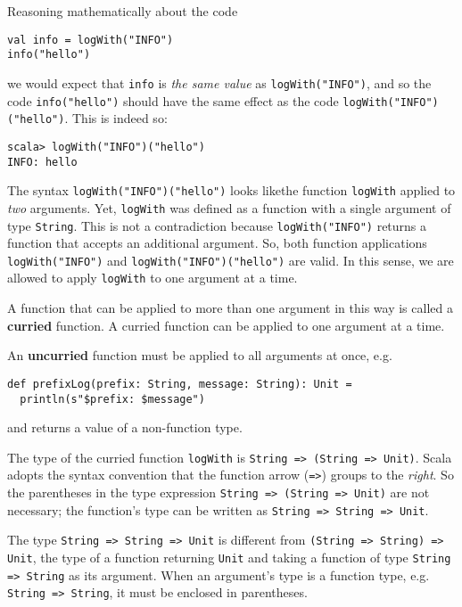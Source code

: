 Reasoning mathematically about the code
\begin{lstlisting}
val info = logWith("INFO")
info("hello")
\end{lstlisting}
we would expect that \lstinline!info! is \emph{the same value} as
\lstinline!logWith("INFO")!, and so the code \lstinline!info("hello")!
should have the same effect as the code \lstinline!logWith("INFO")("hello")!.
This is indeed so:
\begin{lstlisting}
scala> logWith("INFO")("hello")
INFO: hello
\end{lstlisting}
The syntax \lstinline!logWith("INFO")("hello")! looks likethe function
\lstinline!logWith! applied to \emph{two} arguments. Yet, \lstinline!logWith!
was defined as a function with a single argument of type \lstinline!String!.
This is not a contradiction because \lstinline!logWith("INFO")! returns
a function that accepts an additional argument. So, both function
applications \lstinline!logWith("INFO")! and \lstinline!logWith("INFO")("hello")!
are valid. In this sense, we are allowed to apply \lstinline!logWith!
to one argument at a time.

A function that can be applied to more than one argument in this way
is called a \textbf{curried} function. A
curried function can be applied to one argument at a time.

An \textbf{uncurried} function must be
applied to all arguments at once, e.g.
\begin{lstlisting}
def prefixLog(prefix: String, message: String): Unit =
  println(s"$prefix: $message")
\end{lstlisting}
and returns a value of a non-function type.

The type of the curried function \lstinline!logWith! is \lstinline!String => (String => Unit)!.
Scala adopts the syntax convention that the function arrow (\lstinline!=>!)
groups to the \emph{right}. So the parentheses in the type expression
\lstinline!String => (String => Unit)! are not necessary; the function's
type can be written as \lstinline!String => String => Unit!.

The type \lstinline!String => String => Unit! is different from \lstinline!(String => String) => Unit!,
\textendash{} the type of a function returning \lstinline!Unit! and
taking a function of type \lstinline!String => String! as its argument.
When an argument's type is a function type, e.g. \lstinline!String => String!,
it must be enclosed in parentheses.

